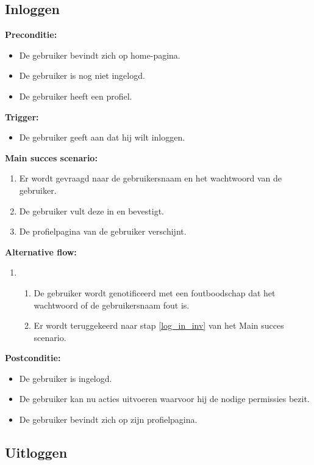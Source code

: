 \documentclass[11pt,twoside,a4paper]{article}
\newcommand{\subpunt}[1]{
	\noindent
	\textbf{\small{#1}}
}
\newenvironment{precond}{
	\subpunt{Preconditie:}
	\begin{itemize}[label={}]
}{
	\end{itemize}
}
\newenvironment{trigger}{
	\subpunt{Trigger:}
	\begin{itemize}[label={}]
}{
	\end{itemize}
}
\newenvironment{mainss}{
	\subpunt{Main succes scenario:}
	\begin{enumerate}
}{
	\end{enumerate}
}
\newenvironment{altern}{
	\subpunt{Alternative flow:}
	\begin{enumerate}
}{
	\end{enumerate}
}
\newenvironment{postcond}{
	\subpunt{Postconditie:}
	\begin{itemize}[label={}]
}{
	\end{itemize}
}
\newcommand{\flowidx}{0}
\newcounter{nstap}
\newcommand{\flowtitle}[1]{					%
	\setcounter{nstap}{0}
	\item[\flowidx.][\emph{#1}]
}
\newcommand{\flowstap}{ 					%
	\stepcounter{nstap}
	\item[\flowidx.\arabic{nstap}]
}
\newenvironment{flow}[2]{					
	\renewcommand{\flowidx}{#1}
	
	\flowtitle{#2}
	\begin{enumerate}
}{
	\end{enumerate}
}
\begin{document}
	
	\subsection{Inloggen}
	
	\begin{precond}
		\item De gebruiker bevindt zich op home-pagina.
		\item De gebruiker is nog niet ingelogd.
		\item De gebruiker heeft een profiel.
	\end{precond}
	
	\begin{trigger}
		\item De gebruiker geeft aan dat hij wilt inloggen.
	\end{trigger}
	
	\begin{mainss}
		\item Er wordt gevraagd naar de gebruikersnaam en het wachtwoord van de gebruiker.\label{log_in_start}
		\item De gebruiker vult deze in en bevestigt.\label{log_in_inv}
		\item De profielpagina van de gebruiker verschijnt.\label{log_in_end}
	\end{mainss}
	
	\begin{altern}
		
		\begin{flow}{\ref{log_in_end}}{De gebruikersnaam en/of het wachtwoord is verkeerd.}
			\flowstap De gebruiker wordt genotificeerd met een foutboodschap dat het wachtwoord of de gebruikersnaam fout is.
			\flowstap Er wordt teruggekeerd naar stap \ref{log_in_inv} van het Main succes scenario.
		\end{flow}
	\end{altern}
	
	\begin{postcond}
		\item De gebruiker is ingelogd.
		\item De gebruiker kan nu acties uitvoeren waarvoor hij de nodige permissies bezit.
		\item De gebruiker bevindt zich op zijn profielpagina.
	\end{postcond}
	
	\subsection{Uitloggen}
	
\end{document}
